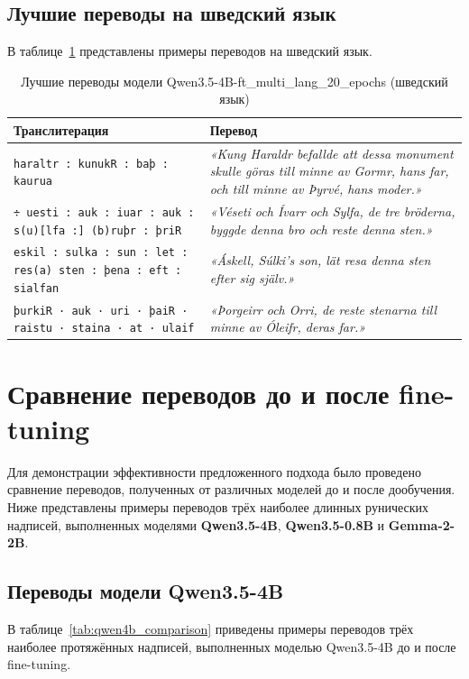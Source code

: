 \documentclass[14pt,a4paper]{extreport}
\begin{document}
\subsection{Лучшие переводы на шведский язык}

В таблице~\ref{tab:best_qwen4b_sv_translations} представлены примеры переводов на шведский язык.

\begin{table}[H]
\centering
\caption{Лучшие переводы модели Qwen3.5-4B-ft\_multi\_lang\_20\_epochs (шведский язык)}
\label{tab:best_qwen4b_sv_translations}
\begin{tabular}{|p{}|p{}|}
\hline
\textbf{Транслитерация} & \textbf{Перевод} \\
\hline
\texttt{haraltr : kunukR : baþ : kaurua} & \textit{«Kung Haraldr befallde att dessa monument skulle göras till minne av Gormr, hans far, och till minne av Þyrvé, hans moder.»} \\
\hline
\texttt{÷ uesti : auk : iuar : auk : s(u)[lfa :] (b)ruþr : þriR} & \textit{«Véseti och Ívarr och Sylfa, de tre bröderna, byggde denna bro och reste denna sten.»} \\
\hline
\texttt{eskil : sulka : sun : let : res(a) sten : þena : eft : sialfan} & \textit{«Áskell, Súlki's son, lät resa denna sten efter sig själv.»} \\
\hline
\texttt{þurkiR · auk · uri · þaiR · raistu · staina · at · ulaif} & \textit{«Þorgeirr och Orri, de reste stenarna till minne av Óleifr, deras far.»} \\
\hline
\end{tabular}
\end{table}

\section{Сравнение переводов до и после fine-tuning}

Для демонстрации эффективности предложенного подхода было проведено сравнение переводов, полученных от различных моделей до и после дообучения. Ниже представлены примеры переводов трёх наиболее длинных рунических надписей, выполненных моделями \textbf{Qwen3.5-4B}, \textbf{Qwen3.5-0.8B} и \textbf{Gemma-2-2B}.

\subsection{Переводы модели Qwen3.5-4B}

В таблице~\ref{tab:qwen4b_comparison} приведены примеры переводов трёх наиболее протяжённых надписей, выполненных моделью Qwen3.5-4B до и после fine-tuning.
\end{document}
